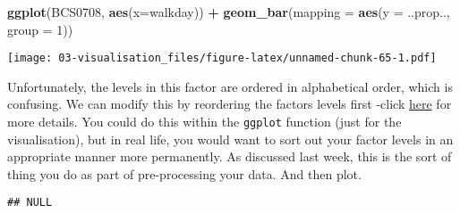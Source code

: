 \documentclass[
]{book}
\newenvironment{Shaded}{\begin{snugshade}}{\end{snugshade}}
\newcommand{\AttributeTok}[1]{\textcolor[rgb]{0.13,0.29,0.53}{#1}}
\newcommand{\CommentTok}[1]{\textcolor[rgb]{0.56,0.35,0.01}{\textit{#1}}}
\newcommand{\DecValTok}[1]{\textcolor[rgb]{0.00,0.00,0.81}{#1}}
\newcommand{\FunctionTok}[1]{\textcolor[rgb]{0.13,0.29,0.53}{\textbf{#1}}}
\newcommand{\NormalTok}[1]{#1}
\newcommand{\OtherTok}[1]{\textcolor[rgb]{0.56,0.35,0.01}{#1}}
\newcommand{\SpecialCharTok}[1]{\textcolor[rgb]{0.81,0.36,0.00}{\textbf{#1}}}
\newcommand{\StringTok}[1]{\textcolor[rgb]{0.31,0.60,0.02}{#1}}
\begin{document}
\begin{Shaded}
\begin{Highlighting}[]
\FunctionTok{ggplot}\NormalTok{(BCS0708, }\FunctionTok{aes}\NormalTok{(}\AttributeTok{x=}\NormalTok{walkday)) }\SpecialCharTok{+}
  \FunctionTok{geom\_bar}\NormalTok{(}\AttributeTok{mapping =} \FunctionTok{aes}\NormalTok{(}\AttributeTok{y =}\NormalTok{ ..prop.., }\AttributeTok{group =} \DecValTok{1}\NormalTok{))}
\end{Highlighting}
\end{Shaded}

\texttt{[image: 03-visualisation\_files/figure-latex/unnamed-chunk-65-1.pdf]}

Unfortunately, the levels in this factor are ordered in alphabetical order, which is confusing. We can modify this by reordering the factors levels first -click \href{http://www.cookbook-r.com/Manipulating_data/Changing_the_order_of_levels_of_a_factor/}{here} for more details. You could do this within the \texttt{ggplot} function (just for the visualisation), but in real life, you would want to sort out your factor levels in an appropriate manner more permanently. As discussed last week, this is the sort of thing you do as part of pre-processing your data. And then plot.

\begin{Shaded}
\end{Shaded}

\begin{verbatim}
## NULL
\end{verbatim}

\begin{Shaded}
\end{Shaded}
\end{document}
